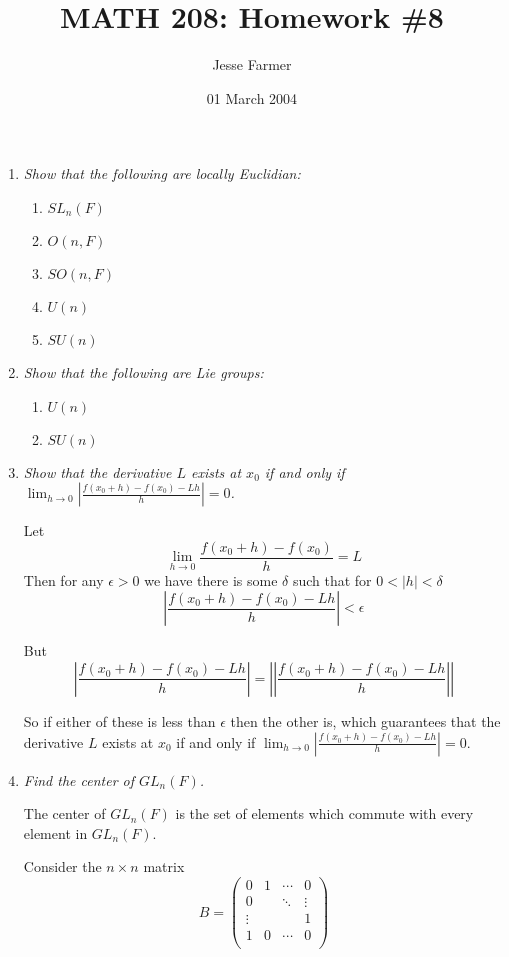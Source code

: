 \documentclass[11pt]{article}
\title{MATH 208: Homework \#8}
\author{Jesse Farmer}
\date{01 March 2004}
\begin{document}
\maketitle
\begin{enumerate}

\item \emph{Show that the following are locally Euclidian:}
\begin{enumerate}
\item \emph{$SL_n(F)$}
\item \emph{$O(n,F)$}
\item \emph{$SO(n,F)$}
\item \emph{$U(n)$}
\item \emph{$SU(n)$}
\end{enumerate}

\item \emph{Show that the following are Lie groups:}
\begin{enumerate}
\item \emph{$U(n)$}
\item \emph{$SU(n)$}
\end{enumerate}

\item \emph{Show that the derivative $L$ exists at $x_0$ if and only if $\lim_{h \rightarrow 0} \left| \frac{f(x_0 + h) - f(x_0) - Lh}{h}\right| = 0$.}

Let 
\[\lim_{h \rightarrow 0} \frac{f(x_0 + h) - f(x_0)}{h} = L\]  
Then for any $\epsilon > 0$ we have there is some $\delta$ such that for $0<|h| < \delta$
\[\left|\frac{ f(x_0 + h) - f(x_0) -Lh}{h} \right| < \epsilon\]

But
\[\left|\frac{ f(x_0 + h) - f(x_0) -Lh}{h} \right| = \left|\left|\frac{ f(x_0 + h) - f(x_0) -Lh}{h} \right|\right|\]

So if either of these is less than $\epsilon$ then the other is, which guarantees that the derivative $L$ exists at $x_0$ if and only if $\lim_{h \rightarrow 0} \left| \frac{f(x_0 + h) - f(x_0) - Lh}{h}\right| = 0$.

\item \emph{Find the center of $GL_n(F)$.}

The center of $GL_n(F)$ is the set of elements which commute with every element in $GL_n(F)$.

Consider the $n \times n$ matrix
\[B = 
\left (
\begin{array}{cccc}
0 & 1 & \cdots & 0 \\
0 &  & \ddots & \vdots \\
\vdots & & & 1 \\
1 & 0 & \cdots & 0 \\
\end{array}
\right )
\]


\end{enumerate}
\end{document}
